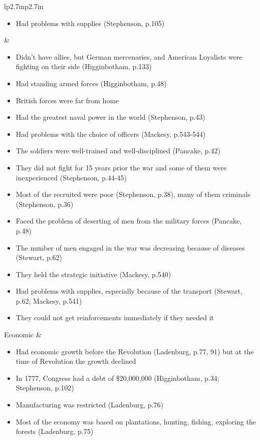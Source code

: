 \begin{singlespace}
\begin{xtabular}{lp{2.7in}p{2.7in}}
\begin{itemize}[nolistsep,leftmargin=*]
	    \item  Had problems with supplies (Stephenson, p.105)
	\end{itemize}
	&
	\begin{itemize}[nolistsep,leftmargin=*]
	    \item  Didn’t have allies, but German mercenaries, and American Loyalists were fighting on their side (Higginbotham, p.133) 
	    \item  Had standing armed forces (Higginbotham, p.48) 
	    \item  British forces were far from home 
	    \item  Had the greatest naval power in the world (Stephenson, p.43) 
	    \item  Had problems with the choice of officers (Mackesy, p.543-544) 
	    \item  The soldiers were well-trained and well-disciplined (Pancake, p.42) 
	    \item  They did not fight for 15 years prior the war and some of them were inexperienced (Stephenson, p.44-45) 
	    \item  Most of the recruited were poor (Stephenson, p.38), many of them criminals (Stephenson, p.36) 
	    \item  Faced the problem of deserting of men from the military forces (Pancake, p.48) 
	    \item  The number of men engaged in the war was decreasing because of diseases (Stewart, p.62) 
	    \item  They held the strategic initiative (Mackesy, p.540) 
	    \item  Had problems with supplies, especially because of the transport (Stewart, p.62; Mackesy, p.541) 
	    \item  They could not get reinforcements immediately if they needed it
	\end{itemize}\NN{}
	Economic & 
	\begin{itemize}[nolistsep,leftmargin=*]
	     \item Had economic growth before the Revolution (Ladenburg, p.77, 91) but at the time of Revolution the growth declined
	     \item In 1777, Congress had a debt of \$20,000,000 (Higginbotham, p.34; Stephenson, p.102)
	     \item Manufacturing was restricted (Ladenburg, p.76)
	     \item Most of the economy was based on plantations, hunting, fishing, exploring the forests (Ladenburg, p.75) 

\end{itemize}
\end{xtabular}
\end{singlespace}

